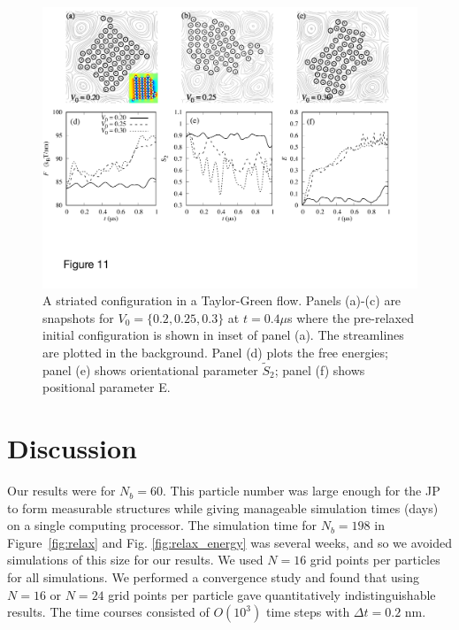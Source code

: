 \documentclass[prb,preprint,showpacs,preprintnumbers,amsmath,amssymb,longbibliography]{revtex4-1}
\begin{document}
\begin{figure}
  \begin{center}
\includegraphics[width=1.0\textwidth]{Figures/Figure11.pdf}            
  \end{center}
  \vspace{-20pt}  
  \caption{\label{fig:BC3_TG} A striated configuration in a Taylor-Green flow. Panels (a)-(c) are snapshots for $V_0=\{0.2, 0.25, 0.3\}$ at $t=0.4\mu$s where the pre-relaxed initial configuration is shown in inset of panel (a). The streamlines are plotted in the background.
Panel (d) plots the free energies; panel (e) shows orientational parameter $\tilde{S}_2$; panel (f) shows positional parameter E.
}
\end{figure}



\section{Discussion}
Our results were for $N_b = 60$.  This particle number was large enough for the JP to form
measurable structures while giving manageable simulation times (days) on a single computing processor.
The simulation time for $N_b = 198$ in Figure~\ref{fig:relax} and Fig. \ref{fig:relax_energy}
was several weeks, and so we avoided simulations of this size for our results.
We used $N = 16$ grid points per particles for all simulations.  We performed a convergence study
and found that using $N = 16$ or $N = 24$ grid points per particle gave quantitatively indistinguishable
results.  The time courses consisted of $O(10^3)$ time steps with $\Delta t = 0.2$ nm. 
\end{document}
